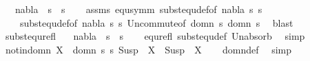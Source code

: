 \begin{isabellebody}
\ \ \ {\isachardoublequoteopen}nabla\ {\isasymTurnstile}\ s{}\ {\isasymapprox}\ s{}{\isachardoublequoteclose}\isanewline
%
\isadelimproof
\ \ %
\endisadelimproof
%
\isatagproof
{}\isamarkupfalse%
\ assms\ equ{\isacharunderscore}{\kern0pt}symm\ subst{\isacharunderscore}{\kern0pt}equ{\isacharunderscore}{\kern0pt}def{\isacharbrackleft}{\kern0pt}of\ nabla\ s{}\ s{}{\isacharbrackright}{\kern0pt}\isanewline
\ \ \ \ subst{\isacharunderscore}{\kern0pt}equ{\isacharunderscore}{\kern0pt}def{\isacharbrackleft}{\kern0pt}of\ nabla\ s{}\ s{}{\isacharbrackright}{\kern0pt}\ Un{\isacharunderscore}{\kern0pt}commute{\isacharbrackleft}{\kern0pt}of\ {\isacartoucheopen}domn\ s{}{\isacartoucheclose}\ {\isacartoucheopen}domn\ s{}{\isacartoucheclose}{\isacharbrackright}{\kern0pt}\ \isamarkupfalse%
\ blast%
\endisatagproof
{\isafoldproof}%
%
\isadelimproof
\isanewline
%
\endisadelimproof
\isanewline
{}\isamarkupfalse%
\ subst{\isacharunderscore}{\kern0pt}equ{\isacharunderscore}{\kern0pt}refl{\isacharcolon}{\kern0pt}\isanewline
\ \ \ {\isachardoublequoteopen}nabla\ {\isasymTurnstile}\ s\ {\isasymapprox}\ s{\isachardoublequoteclose}\isanewline
%
\isadelimproof
\ \ %
\endisadelimproof
%
\isatagproof
{}\isamarkupfalse%
\ equ{\isacharunderscore}{\kern0pt}refl\ subst{\isacharunderscore}{\kern0pt}equ{\isacharunderscore}{\kern0pt}def\ Un{\isacharunderscore}{\kern0pt}absorb\ \isamarkupfalse%
\ simp%
\endisatagproof
{\isafoldproof}%
%
\isadelimproof
\isanewline
%
\endisadelimproof
\isanewline
{}\isamarkupfalse%
\ not{\isacharunderscore}{\kern0pt}in{\isacharunderscore}{\kern0pt}domn{\isacharcolon}{\kern0pt}\ {\isachardoublequoteopen}X\ {\isasymnotin}\ {\isacharparenleft}{\kern0pt}domn\ s{\isacharparenright}{\kern0pt}{\isasymLongrightarrow}\ {\isacharparenleft}{\kern0pt}s\ {\isacharparenleft}{\kern0pt}Susp\ {\isacharbrackleft}{\kern0pt}{\isacharbrackright}{\kern0pt}\ X{\isacharparenright}{\kern0pt}{\isacharparenright}{\kern0pt}\ {\isacharequal}{\kern0pt}\ {\isacharparenleft}{\kern0pt}Susp\ {\isacharbrackleft}{\kern0pt}{\isacharbrackright}{\kern0pt}\ X{\isacharparenright}{\kern0pt}{\isachardoublequoteclose}\isanewline
%
\isadelimproof
\ \ %
\endisadelimproof
%
\isatagproof
{}\isamarkupfalse%
\ domn{\isacharunderscore}{\kern0pt}def\ \isamarkupfalse%
\ simp%
\endisatagproof
{\isafoldproof}%
%
\isadelimproof
\isanewline
%
\endisadelimproof
\isanewline

\end{isabellebody}
